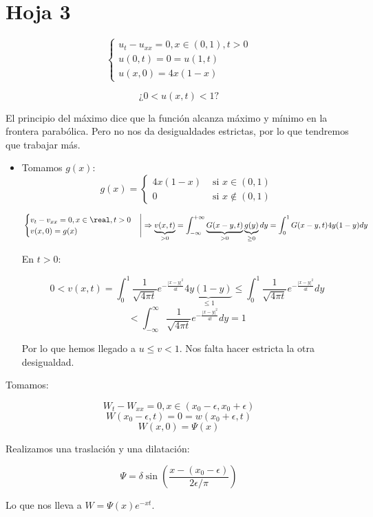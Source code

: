 \section{Hoja 3}

\begin{problem}[12]

	\[\begin{cases}
		u_t - u_{xx} = 0, x \in (0,1), t > 0\\
		u(0,t) = 0 = u(1,t)\\
		u(x,0) = 4x(1-x)
	\end{cases}\]

	\[\text{¿} 0 < u(x,t) < 1 \text{?}\]

\solution

	El principio del máximo dice que la función alcanza máximo y mínimo en la frontera parabólica. Pero no nos da desigualdades estrictas, por lo que tendremos que trabajar más.

	\begin{itemize}
		\item Tomamos $g(x)$:
		\[g(x) = \begin{cases}
			4x(1-x) & \text{ si } x \in (0,1) \\
			0 & \text{ si } x \not\in (0,1)
		\end{cases}\]

		\[ \left. \begin{cases} v_t - v_{xx} = 0, x \in \real, t > 0 \\
			v(x,0) = g(x)
		\end{cases} \right| \Rightarrow \underbrace{v(x,t)}_{>0} = \int_{-\infty}^{+\infty} \underbrace{G(x-y,t)}_{>0} \underbrace{g(y)}_{\geq 0} dy = \int_0^1 G(x-y,t) 4y(1-y) dy \]

		En $t > 0$:

			\[ 0 < v(x,t) = \int_0^1  \frac{1}{\sqrt{4\pi t}} e^{-\frac{|x-y|^2}{4t}} \underbrace{4y(1-y)}_{\leq 1} \leq \int_0^1 \frac{1}{\sqrt{4\pi t}} e^{-\frac{|x-y|^2}{4t}} dy \]
			\[ < \int_{-\infty}^{\infty}  \frac{1}{\sqrt{4\pi t}} e^{-\frac{|x-y|^2}{4t}} dy = 1 \]

			Por lo que hemos llegado a $u \leq v < 1$. Nos falta hacer estricta la otra desigualdad.
	\end{itemize}

	Tomamos:

	\[W_t - W_{xx} = 0, x \in (x_0 - \epsilon, x_0 + \epsilon)\]
	\[W(x_0-\epsilon,t) = 0 = w(x_0+\epsilon, t)\]
	\[W(x,0) = \Psi(x)\]

	Realizamos una traslación y una dilatación:

	\[ \Psi = \delta \sin(\frac{x- (x_0 - \epsilon)}{2\epsilon/\pi}) \]

	Lo que nos lleva a $W = \Psi(x) e^{-xt}$.

\end{problem}